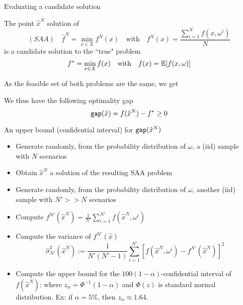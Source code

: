 














\begin{frame}{Evaluating a candidate solution }

The point $\hat x^N$ solution  of
\[
(SAA)\quad \hat f^N=\min_{x \in X} f^N(x)\quad \mbox{with}\quad f^N(x)=\frac{\sum_{i=1}^N f(x,\omega^i)}{N}
\]
is a candidate solution to the ``true" problem
\[
f^*=\min_{x \in X} f(x)\quad \mbox{with}\quad f(x)=\mathbb{E}[f(x,\omega)]
\]
\pula

As the feasible set of both problems are the same, we get 

\pula
We thus have the following  optimality gap
\[
{\tt gap} (\hat x)=f(\hat x^N)- f^*\geq 0
\]

 \end{frame}


\begin{frame}{An upper bound (confidential interval) for ${\tt gap}(\hat x^N)$}
\begin{itemize}
\item Generate randomly, from the probability distribution of $\omega$, a (iid) sample with $N$ scenarios
\pula
\item Obtain  $\hat x^N$ a solution of the resulting SAA problem
\pula
\item Generate randomly, from the probability distribution of $\omega$, another (iid) sample with $N'>>N$ scenarios
\pula
\item Compute $f^{N'}(\hat x^N)= \frac{1}{N'}\sum_{i=1}^{N'} f(\hat x^N,\omega^i)$
\pula
\item Compute the variance of $f^{N'}(\hat x)$
\[
\hat \sigma_{N'}^2(\hat x^N):=\frac{1}{N'(N'-1)}\sum_{i=1}^{N'} [f(\hat x^N,\omega^i)-f^{N'}(\hat x^N)]^2
\]
\item Compute the upper bound for the  $100(1-\alpha)$-confidential interval of $f(\hat x^N)$:
\azul{
\[
U_{N}'(\hat x^N):= f^{N'}(\hat x^N) + z_{\alpha}\hat \sigma_{N'}(\hat x^N)\,,
\]
}
where $z_\alpha=\Phi^{-1}(1-\alpha)$ and $\Phi(z)$ is standard normal distribution. Ex: if $\alpha =5\%$, then $z_\alpha\approx 1.64$.
\end{itemize}
\end{frame}

